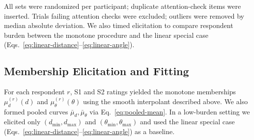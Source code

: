 \documentclass[final,3p,times,review]{elsarticle}
\begin{document}
All sets were randomized per participant; duplicate attention-check items were inserted. Trials failing attention checks were excluded; outliers were removed by median absolute deviation. We also timed elicitation to compare respondent burden between the monotone procedure and the linear special case (Eqs.~\eqref{eq:linear-distance}--\eqref{eq:linear-angle}).

\subsection{Membership Elicitation and Fitting}
For each respondent $r$, S1 and S2 ratings yielded the monotone memberships $\mu^{(r)}_d(d)$ and $\mu^{(r)}_\theta(\theta)$ using the smooth interpolant described above. We also formed pooled curves $\bar{\mu}_d,\bar{\mu}_\theta$ via Eq.~\eqref{eq:pooled-mean}. In a low-burden setting we elicited only $(d_{\min},d_{\max})$ and $(\theta_{\min},\theta_{\max})$ and used the linear special case (Eqs.~\eqref{eq:linear-distance}--\eqref{eq:linear-angle}) as a baseline.
\end{document}
